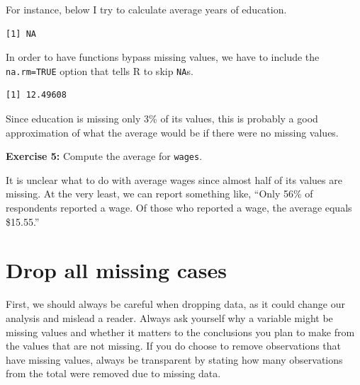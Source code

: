 \documentclass[
]{book}
\makeatletter
\newenvironment{Shaded}{\begin{snugshade}}{\end{snugshade}}
\newcommand{\AttributeTok}[1]{\textcolor[rgb]{0.61,0.61,0.61}{#1}}
\newcommand{\ConstantTok}[1]{\textcolor[rgb]{0,0,0}{#1}}
\newcommand{\FunctionTok}[1]{\textcolor[rgb]{0,0,0}{#1}}
\newcommand{\NormalTok}[1]{#1}
\newcommand{\SpecialCharTok}[1]{\textcolor[rgb]{0,0,0}{#1}}
\newenvironment{kframe}{%
\medskip{}
\setlength{\fboxsep}{.8em}
 \def\at@end@of@kframe{}%
 \ifinner\ifhmode%
  \def\at@end@of@kframe{\end{minipage}}%
  \begin{minipage}{\columnwidth}%
 \fi\fi%
 \def\FrameCommand##1{\hskip\@totalleftmargin \hskip-\fboxsep
 \colorbox{shadecolor}{##1}\hskip-\fboxsep
     \hskip-\linewidth \hskip-\@totalleftmargin \hskip\columnwidth}%
 \MakeFramed {\advance\hsize-\width
   \@totalleftmargin\z@ \linewidth\hsize
   \@setminipage}}%
 {\par\unskip\endMakeFramed%
 \at@end@of@kframe}
\renewenvironment{Shaded}{\begin{kframe}}{\end{kframe}}
\newenvironment{rmdblock}[1]
  {\begin{shaded*}
  }
  {\end{shaded*}
  }
\newenvironment{learncheck}
  {\begin{rmdblock}{warning}}
  {\end{rmdblock}}
\makeatother
\begin{document}
For instance, below I try to calculate average years of education.

\begin{Shaded}
\end{Shaded}

\begin{verbatim}
[1] NA
\end{verbatim}

In order to have functions bypass missing values, we have to include the \texttt{na.rm=TRUE} option that tells R to skip \texttt{NA}s.

\begin{Shaded}
\end{Shaded}

\begin{verbatim}
[1] 12.49608
\end{verbatim}

Since education is missing only 3\% of its values, this is probably a good approximation of what the average would be if there were no missing values.

\begin{learncheck}
\textbf{Exercise 5:} Compute the average for \texttt{wages}.
\end{learncheck}

It is unclear what to do with average wages since almost half of its values are missing. At the very least, we can report something like, ``Only 56\% of respondents reported a wage. Of those who reported a wage, the average equals \$15.55.''

\hypertarget{drop-all-missing-cases}{%
\section{Drop all missing cases}\label{drop-all-missing-cases}}

First, we should always be careful when dropping data, as it could change our analysis and mislead a reader. Always ask yourself why a variable might be missing values and whether it matters to the conclusions you plan to make from the values that are not missing. If you do choose to remove observations that have missing values, always be transparent by stating how many observations from the total were removed due to missing data.
\end{document}
